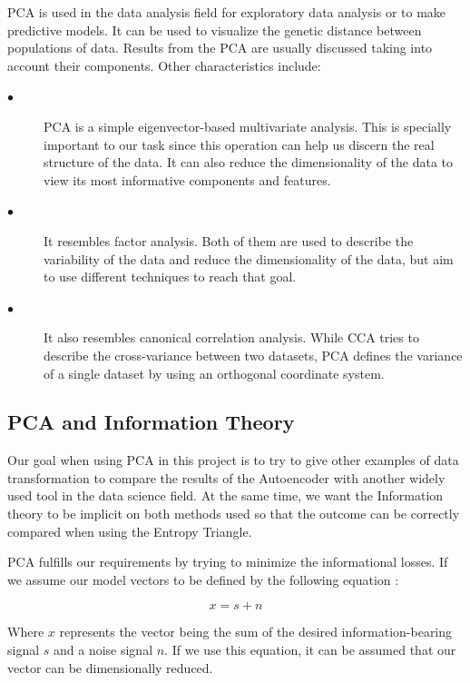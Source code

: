PCA is used in the data analysis field for exploratory data analysis or to make predictive models. It can be used to visualize the genetic distance between populations of data. Results from the PCA are usually discussed taking into account their components. Other characteristics include:

\begin{description}
	
	\item[$\bullet$] PCA is a simple eigenvector-based multivariate analysis. This is specially important to our task since this operation can help us discern the real structure of the data. It can also reduce the dimensionality of the data to view its most informative components and features.
	
	\item[$\bullet$] It resembles factor analysis. Both of them are used to describe the variability of the data and reduce the dimensionality of the data, but aim to use different techniques to reach that goal.
	
	\item[$\bullet$] It also resembles canonical correlation analysis. While CCA tries to describe the cross-variance between two datasets, PCA defines the variance of a single dataset by using an orthogonal coordinate system.
	
\end{description}

\subsection{PCA and Information Theory}

Our goal when using PCA in this project is to try to give other examples of data transformation to compare the results of the Autoencoder with another widely used tool in the data science field. At the same time, we want the Information theory to be implicit on both methods used so that the outcome can be correctly compared when using the Entropy Triangle.\par

PCA fulfills our requirements by trying to minimize the informational losses. If we assume our model vectors to be defined by the  following equation :

\begin{equation}\label{eq:pca_equation}
x = s + n 
\end{equation}

Where $x$ represents the vector being the sum of the desired information-bearing signal $s$ and a noise signal $n$. If we use this equation, it can be assumed that our vector can be dimensionally reduced.\par

